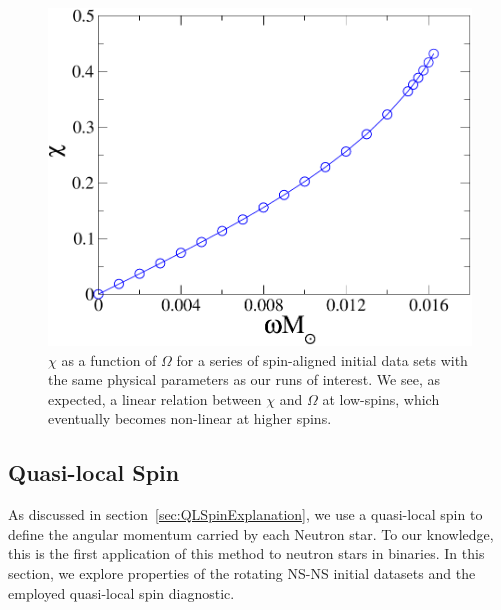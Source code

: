 \documentclass[aps,prd,amsmath,floatfix
,twocolumn
,superscriptaddress,nofootinbib,showpacs]{revtex4-1}
\theoremstyle{plain} \newtheorem{thm}{Theorem} \newtheorem{lem}{Lemma}
\newcommand{\red}[1]{\textcolor{Red}{#1}}
\begin{document}
\begin{figure}
\includegraphics[width=0.95\columnwidth]{ChiVOmega}
\caption{{\label{fig:ChiVOmega}} $\chi$ as a function of $\Omega$ for
  a series of spin-aligned initial data sets with the same physical
  parameters as our runs of interest. We see, as expected, a linear
  relation between $\chi$ and $\Omega$ at low-spins, which eventually
  becomes non-linear at higher spins. }
\end{figure}


\subsection{Quasi-local Spin}
\label{sec:QLSpinProperties}

As discussed in section~\ref{sec:QLSpinExplanation}, we use a
quasi-local spin to define the angular momentum carried by each
Neutron star.  To our knowledge, this is the first application of this
method to neutron stars in binaries. 
In this section, we explore properties of the rotating NS-NS initial datasets and the employed quasi-local spin diagnostic.
\end{document}
